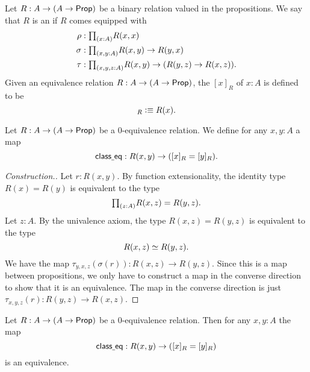 \begin{defn}\label{defn:eq_rel}
Let $R:A\to (A\to\mathsf{Prop})$ be a binary relation valued in the propositions. We say that $R$ is an  if $R$ comes equipped with
\begin{align*}
\rho & : \prd{x:A}R(x,x) \\
\sigma & : \prd{x,y:A} R(x,y)\to R(y,x) \\
\tau & : \prd{x,y,z:A} R(x,y)\to (R(y,z)\to R(x,z)).
\end{align*}
Given an equivalence relation $R:A\to (A\to\mathsf{Prop})$, the  $[x]_R$ of $x:A$ is defined to be
\begin{equation*}
[x]_R\defeq R(x).
\end{equation*}
\end{defn}

\begin{defn}
Let $R:A\to (A\to\mathsf{Prop})$ be a $0$-equivalence relation. 
We define for any $x,y:A$ a map
\begin{equation*}
\mathsf{class\underline{\ }{}eq}:R(x,y)\to ([x]_R=[y]_R).
\end{equation*}
\end{defn}

\begin{proof}[Construction.]
Let $r:R(x,y)$. By function extensionality, the identity type $R(x)=R(y)$ is equivalent to the type
\begin{equation*}
\prd{z:A}R(x,z)=R(y,z).
\end{equation*}
Let $z:A$. By the univalence axiom, the type $R(x,z)=R(y,z)$ is equivalent to the type
\begin{equation*}
\eqv{R(x,z)}{R(y,z)}.
\end{equation*}
We have the map $\tau_{y,x,z}(\sigma(r)):R(x,z)\to R(y,z)$. Since this is a map between propositions, we only have to construct a map in the converse direction to show that it is an equivalence. The map in the converse direction is just $\tau_{x,y,z}(r):R(y,z)\to R(x,z)$. 
\end{proof}

\begin{thm}\label{thm:equivalence_classes}
Let $R:A\to (A\to\mathsf{Prop})$ be a $0$-equivalence relation. 
Then for any $x,y:A$ the map
\begin{equation*}
\mathsf{class\underline{\ }{}eq} : R(x,y)\to ([x]_R=[y]_R)
\end{equation*}
is an equivalence.
\end{thm}

